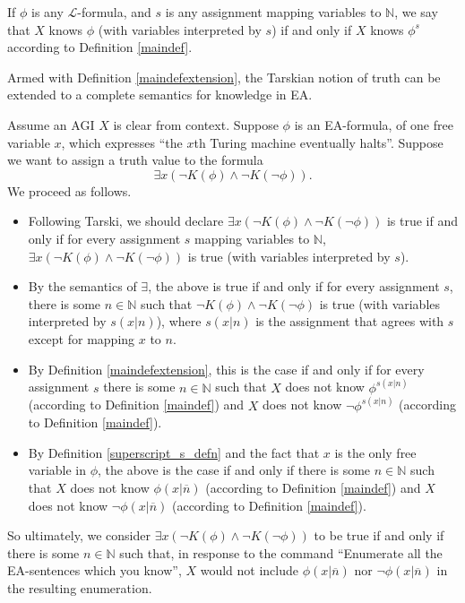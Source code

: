 \documentclass[runningheads]{llncs}
\begin{document}
\begin{definition}
\label{maindefextension}
  If $\phi$ is any $\mathscr L$-formula,
  and $s$ is any assignment mapping variables to $\mathbb N$,
  we say that $X$ knows $\phi$ (with variables interpreted by $s$) if and only if
  $X$ knows $\phi^s$ according to Definition \ref{maindef}.
\end{definition}

Armed with Definition \ref{maindefextension}, the Tarskian notion
\cite{sep-tarski-truth} of
truth can be extended to a complete semantics for
knowledge in EA.

\begin{example}
  Assume an AGI $X$ is clear from context.
  Suppose $\phi$ is an EA-formula, of one free variable $x$,
  which expresses ``the $x$th Turing machine eventually halts''. Suppose we want to
  assign a truth value to the formula
  \[
  \exists x (\neg K(\phi)\wedge \neg K(\neg\phi)).
  \]
  We proceed as follows.
  \begin{itemize}
  \item Following Tarski, we should declare $\exists x (\neg K(\phi)\wedge\neg K(\neg\phi))$
  is true if and only if for every assignment $s$ mapping variables to $\mathbb N$,
  $\exists x (\neg K(\phi)\wedge\neg K(\neg\phi))$ is true (with variables interpreted
  by $s$).
  \item
  By the semantics of $\exists$, the above is true if and only if
  for every assignment $s$, there is some $n\in\mathbb N$ such that
  $\neg K(\phi)\wedge\neg K(\neg\phi)$ is true (with variables interpreted by $s(x|n)$),
  where $s(x|n)$ is the assignment that agrees with $s$ except for mapping $x$ to $n$.
  \item
  By Definition \ref{maindefextension}, this is the case if and only if
  for every assignment $s$ there is
  some $n\in\mathbb N$ such that
  $X$ does not know $\phi^{s(x|n)}$ (according to Definition \ref{maindef})
  and $X$ does not know $\neg\phi^{s(x|n)}$ (according to Definition \ref{maindef}).
  \item
  By Definition \ref{superscript_s_defn} and the fact that $x$ is the only free
  variable in $\phi$, the above is the case if and only if there
  is some $n\in\mathbb N$ such that
  $X$ does not know $\phi(x|\overline n)$ (according to Definition \ref{maindef})
  and $X$ does not know $\neg\phi(x|\overline n)$ (according to Definition \ref{maindef}).
  \end{itemize}
  So ultimately, we consider $\exists x (\neg K(\phi)\wedge \neg K(\neg\phi))$
  to be true if and only if there is some $n\in \mathbb N$ such that,
  in response to the command
  ``Enumerate all the EA-sentences which you know'',
  $X$ would not include $\phi(x|\overline n)$ nor $\neg\phi(x|\overline n)$
  in the resulting enumeration.
\end{example}
\end{document}

